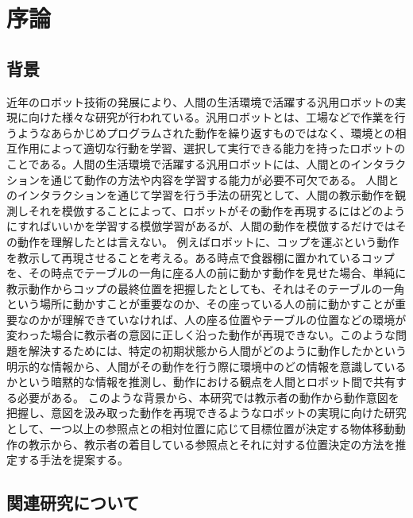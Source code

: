 ﻿%
\chapter{序論}

\section{背景}

近年のロボット技術の発展により、人間の生活環境で活躍する汎用ロボットの実現に向けた様々な研究が行われている。汎用ロボットとは、工場などで作業を行うようなあらかじめプログラムされた動作を繰り返すものではなく、環境との相互作用によって適切な行動を学習、選択して実行できる能力を持ったロボットのことである。人間の生活環境で活躍する汎用ロボットには、人間とのインタラクションを通じて動作の方法や内容を学習する能力が必要不可欠である。
人間とのインタラクションを通じて学習を行う手法の研究として、人間の教示動作を観測しそれを模倣することによって、ロボットがその動作を再現するにはどのようにすればいいかを学習する模倣学習があるが、人間の動作を模倣するだけではその動作を理解したとは言えない。
例えばロボットに、コップを運ぶという動作を教示して再現させることを考える。ある時点で食器棚に置かれているコップを、その時点でテーブルの一角に座る人の前に動かす動作を見せた場合、単純に教示動作からコップの最終位置を把握したとしても、それはそのテーブルの一角という場所に動かすことが重要なのか、その座っている人の前に動かすことが重要なのかが理解できていなければ、人の座る位置やテーブルの位置などの環境が変わった場合に教示者の意図に正しく沿った動作が再現できない。このような問題を解決するためには、特定の初期状態から人間がどのように動作したかという明示的な情報から、人間がその動作を行う際に環境中のどの情報を意識しているかという暗黙的な情報を推測し、動作における観点を人間とロボット間で共有する必要がある。
このような背景から、本研究では教示者の動作から動作意図を把握し、意図を汲み取った動作を再現できるようなロボットの実現に向けた研究として、一つ以上の参照点との相対位置に応じて目標位置が決定する物体移動動作の教示から、教示者の着目している参照点とそれに対する位置決定の方法を推定する手法を提案する。

\section{関連研究について}

